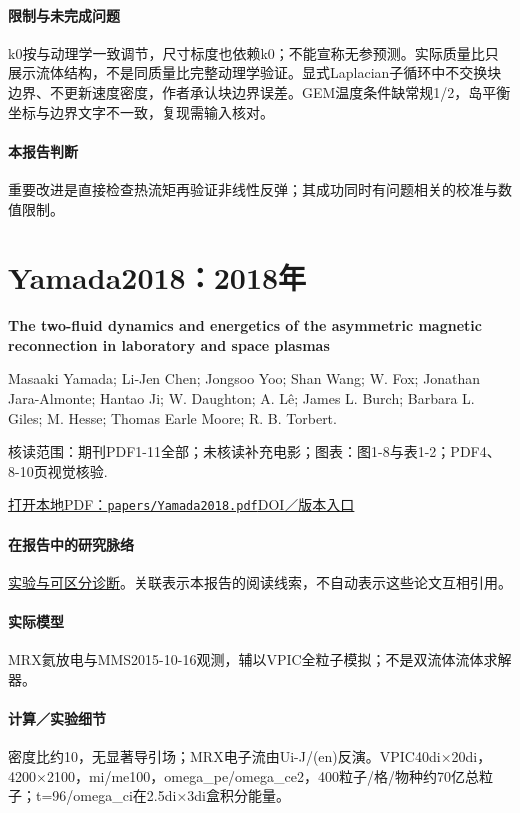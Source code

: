 \documentclass[UTF8,a4paper,11pt,openany,fontset=fandol]{ctexbook}
\begin{document}
\paragraph{限制与未完成问题}k0按与动理学一致调节，尺寸标度也依赖k0；不能宣称无参预测。实际质量比只展示流体结构，不是同质量比完整动理学验证。显式Laplacian子循环中不交换块边界、不更新速度密度，作者承认块边界误差。GEM温度条件缺常规1/2，岛平衡坐标与边界文字不一致，复现需输入核对。

\paragraph{本报告判断}重要改进是直接检查热流矩再验证非线性反弹；其成功同时有问题相关的校准与数值限制。

\section{Yamada2018：2018年}\label{paper:Yamada2018}

\textbf{The two-fluid dynamics and energetics of the asymmetric magnetic reconnection in laboratory and space plasmas}\citep{Yamada2018}\

Masaaki Yamada;  Li‐Jen Chen;  Jongsoo Yoo;  Shan Wang;  W. Fox;  Jonathan Jara-Almonte;  Hantao Ji;  W. Daughton;  A. Lê;  James L. Burch;  Barbara L. Giles;  M. Hesse;  Thomas Earle Moore;  R. B. Torbert.

\textsf{核读范围：}期刊PDF1-11全部；未核读补充电影；\textsf{图表：}图1-8与表1-2；PDF4、8-10页视觉核验.

\href{run:../papers/Yamada2018.pdf}{打开本地PDF：\texttt{papers/Yamada2018.pdf}}\quad\href{https://doi.org/10.1038/s41467-018-07680-2}{DOI／版本入口}

\paragraph{在报告中的研究脉络}\hyperref[story:diagnostic]{实验与可区分诊断}。关联表示本报告的阅读线索，不自动表示这些论文互相引用。

\paragraph{实际模型}MRX氦放电与MMS2015-10-16观测，辅以VPIC全粒子模拟；不是双流体流体求解器。

\paragraph{计算／实验细节}密度比约10，无显著导引场；MRX电子流由Ui-J/(en)反演。VPIC40di×20di，4200×2100，mi/me100，omega\_pe/omega\_ce2，400粒子/格/物种约70亿总粒子；t=96/omega\_ci在2.5di×3di盒积分能量。
\end{document}
